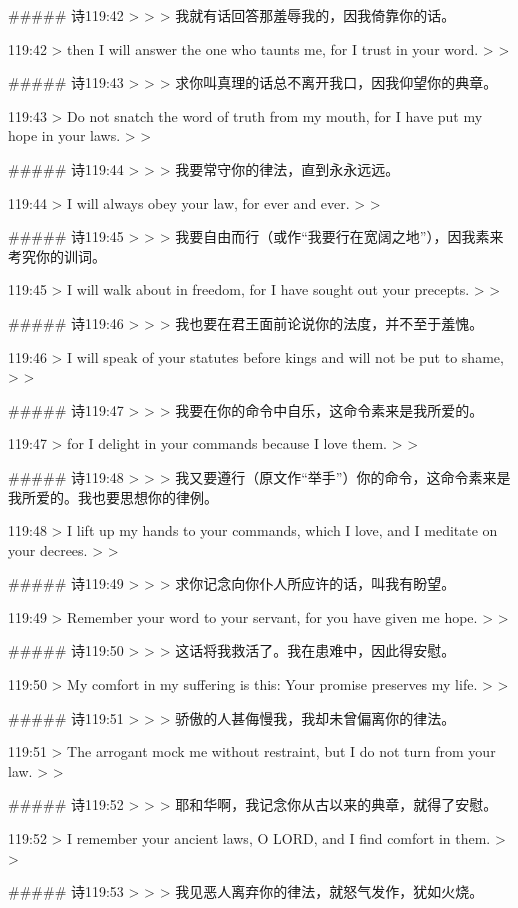 ##### 诗119:42
> 
>
> 我就有话回答那羞辱我的，因我倚靠你的话。


119:42
> then I will answer the one who taunts me, for I trust in your word.
>
> 


##### 诗119:43
> 
>
> 求你叫真理的话总不离开我口，因我仰望你的典章。


119:43
> Do not snatch the word of truth from my mouth, for I have put my hope in your laws.
>
> 


##### 诗119:44
> 
>
> 我要常守你的律法，直到永永远远。


119:44
> I will always obey your law, for ever and ever.
>
> 


##### 诗119:45
> 
>
> 我要自由而行（或作“我要行在宽阔之地”），因我素来考究你的训词。


119:45
> I will walk about in freedom, for I have sought out your precepts.
>
> 


##### 诗119:46
> 
>
> 我也要在君王面前论说你的法度，并不至于羞愧。


119:46
> I will speak of your statutes before kings and will not be put to shame,
>
> 


##### 诗119:47
> 
>
> 我要在你的命令中自乐，这命令素来是我所爱的。


119:47
> for I delight in your commands because I love them.
>
> 


##### 诗119:48
> 
>
> 我又要遵行（原文作“举手”）你的命令，这命令素来是我所爱的。我也要思想你的律例。


119:48
> I lift up my hands to your commands, which I love, and I meditate on your decrees.
>
> 


##### 诗119:49
> 
>
> 求你记念向你仆人所应许的话，叫我有盼望。


119:49
> Remember your word to your servant, for you have given me hope.
>
> 


##### 诗119:50
> 
>
> 这话将我救活了。我在患难中，因此得安慰。


119:50
> My comfort in my suffering is this: Your promise preserves my life.
>
> 


##### 诗119:51
> 
>
> 骄傲的人甚侮慢我，我却未曾偏离你的律法。


119:51
> The arrogant mock me without restraint, but I do not turn from your law.
>
> 


##### 诗119:52
> 
>
> 耶和华啊，我记念你从古以来的典章，就得了安慰。


119:52
> I remember your ancient laws, O LORD, and I find comfort in them.
>
> 


##### 诗119:53
> 
>
> 我见恶人离弃你的律法，就怒气发作，犹如火烧。


